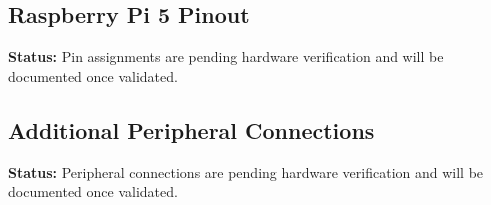 \subsection{Raspberry Pi 5 Pinout}

\textbf{Status:} Pin assignments are pending hardware verification and will be documented once validated.

\subsection{Additional Peripheral Connections}

\textbf{Status:} Peripheral connections are pending hardware verification and will be documented once validated.

